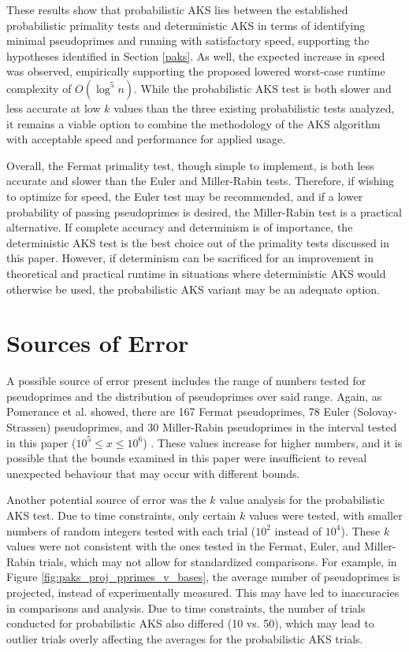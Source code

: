 \documentclass{article}
\begin{document}
These results show that probabilistic AKS lies between the established probabilistic primality tests and deterministic AKS in terms of identifying minimal pseudoprimes and running with satisfactory speed, supporting the hypotheses identified in Section \ref{paks}. As well, the expected increase in speed was observed, empirically supporting the proposed lowered worst-case runtime complexity of $O(\log^5{n})$. While the probabilistic AKS test is both slower and less accurate at low $k$ values than the three existing probabilistic tests analyzed, it remains a viable option to combine the methodology of the AKS algorithm with acceptable speed and performance for applied usage.

Overall, the Fermat primality test, though simple to implement, is both less accurate and slower than the Euler and Miller-Rabin tests. Therefore, if wishing to optimize for speed, the Euler test may be recommended, and if a lower probability of passing pseudoprimes is desired, the Miller-Rabin test is a practical alternative. If complete accuracy and determinism is of importance, the deterministic AKS test is the best choice out of the primality tests discussed in this paper. However, if determinism can be sacrificed for an improvement in theoretical and practical runtime in situations where deterministic AKS would otherwise be used, the probabilistic AKS variant may be an adequate option.

\section{Sources of Error}
\label{soe}
A possible source of error present includes the range of numbers tested for pseudoprimes and the distribution of pseudoprimes over said range. Again, as Pomerance et al. showed, there are 167 Fermat pseudoprimes, 78 Euler (Solovay-Strassen) pseudoprimes, and 30 Miller-Rabin pseudoprimes in the interval tested in this paper ($10^5 \leq x \leq 10^6$) \cite{pomerance_pseudoprimes_1980}. These values increase for higher numbers, and it is possible that the bounds examined in this paper were insufficient to reveal unexpected behaviour that may occur with different bounds.

Another potential source of error was the $k$ value analysis for the probabilistic AKS test. Due to time constraints, only certain $k$ values were tested, with smaller numbers of random integers tested with each trial ($10^2$ instead of $10^4$). These $k$ values were not consistent with the ones tested in the Fermat, Euler, and Miller-Rabin trials, which may not allow for standardized comparisons. For example, in Figure \ref{fig:paks_proj_pprimes_v_bases}, the average number of pseudoprimes is projected, instead of experimentally measured. This may have led to inaccuracies in comparisons and analysis. Due to time constraints, the number of trials conducted for probabilistic AKS also differed (10 vs. 50), which may lead to outlier trials overly affecting the averages for the probabilistic AKS trials.
\end{document}
